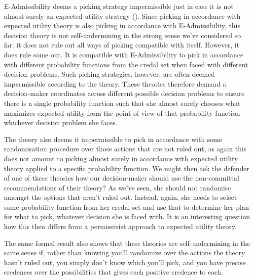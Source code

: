 \documentclass[a4paper]{article}
\newenvironment{CCM rewritten}
{\begingroup\color{blue}} %
{\endgroup}              %
\begin{document}
	E-Admissibility deems a picking strategy impermissible just in case it is not almost surely an expected utility strategy (). Since picking in accordance with expected utility theory is also picking in accordance with E-Admissibility, this decision theory is not self-undermining in the strong sense we've considered so far: it does not rule out all ways of picking compatible with itself. However, it does rule some out.
	 It is compatible with E-Admissibility to pick in accordance with different probability functions from the credal set when faced with different decision problems. 
	 Such picking strategies, however, are often deemed impermissible according to the theory.
	 These theories therefore demand a decision-maker coordinates across different possible decision problems to ensure there is a single probability function such that she almost surely chooses what maximizes expected utility from the point of view of that probability function whichever decision problem she faces.
	 
	 The theory also deems it impermissible to pick in accordance with some randomisation procedure over those actions that are not ruled out,
	 as again this does not amount to picking almost surely in accordance with expected utility theory applied to a specific probability function. 
	 We might then ask the defender of one of these theories how our decision-maker should use the non-committal recommendations of their theory? As we've seen, she should not randomise amongst the options that aren't ruled out. Instead, again, she needs to select some probability function from her credal set and use that to determine her plan for what to pick, whatever decision she is faced with. 
	 It is an interesting question how this then differs from a permissivist approach to expected utility theory. 
	 
	 The same formal result also shows that these theories are self-undermining in the same sense if, rather than knowing you'll randomize over the actions the theory hasn't ruled out, you simply don't know which you'll pick, and you have precise credences over the possibilities that gives each positive credence to each.%
	 
\end{document}
